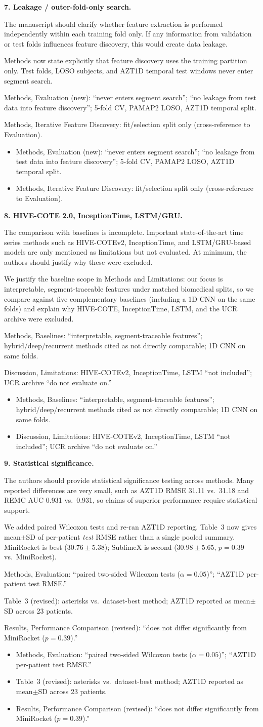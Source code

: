 \documentclass[11pt]{article}
\makeatletter
\newcommand{\rsp}{\par\vspace{0.9em}}
\newcommand{\rcitem}[2]{\begin{reviewerbox}\textbf{#1}\par\smallskip#2\end{reviewerbox}}
\newcommand{\response}[2]{%
  \begin{responsebox}#1%
  \def\@responseitems{#2}%
  \ifx\@responseitems\empty\else\begin{itemize}[nosep,leftmargin=1.2em]#2\end{itemize}\fi
  \end{responsebox}\rsp}
\makeatother
\begin{document}
\rcitem{7. Leakage / outer-fold-only search.}{The manuscript should clarify whether feature
extraction is performed independently within each training fold only. If any information from
validation or test folds influences feature discovery, this would create data leakage.}

\response{Methods now state explicitly that feature discovery uses the training partition only.
Test folds, LOSO subjects, and AZT1D temporal test windows never enter segment search.}{
  \item Methods, Evaluation (new): ``never enters segment search''; ``no leakage from test data into
    feature discovery''; 5-fold CV, PAMAP2 LOSO, AZT1D temporal split.
  \item Methods, Iterative Feature Discovery: fit/selection split only (cross-reference to Evaluation).
}

\rcitem{8. HIVE-COTE 2.0, InceptionTime, LSTM/GRU.}{The comparison with baselines is incomplete.
Important state-of-the-art time series methods such as HIVE-COTEv2, InceptionTime, and
LSTM/GRU-based models are only mentioned as limitations but not evaluated. At minimum, the authors
should justify why these were excluded.}

\response{We justify the baseline scope in Methods and Limitations: our focus is interpretable,
segment-traceable features under matched biomedical splits, so we compare against five complementary
baselines (including a 1D CNN on the same folds) and explain why HIVE-COTE, InceptionTime, LSTM, and
the UCR archive were excluded.}{
  \item Methods, Baselines: ``interpretable, segment-traceable features''; hybrid/deep/recurrent
    methods cited as not directly comparable; 1D CNN on same folds.
  \item Discussion, Limitations: HIVE-COTEv2, InceptionTime, LSTM ``not included''; UCR archive
    ``do not evaluate on.''
}

\rcitem{9. Statistical significance.}{The authors should provide statistical significance testing
across methods. Many reported differences are very small, such as AZT1D RMSE 31.11 vs.\ 31.18 and
REMC AUC 0.931 vs.\ 0.931, so claims of superior performance require statistical support.}

\response{We added paired Wilcoxon tests and re-ran AZT1D reporting. Table~3 now gives
mean$\pm$SD of per-patient \emph{test} RMSE rather than a single pooled summary.
MiniRocket is best ($30.76 \pm 5.38$); SublimeX is second ($30.98 \pm 5.65$, $p{=}0.39$ vs.\
MiniRocket).}{
  \item Methods, Evaluation: ``paired two-sided Wilcoxon tests ($\alpha{=}0.05$)''; ``AZT1D
    per-patient test RMSE.''
  \item Table~3 (revised): asterisks vs.\ dataset-best method; AZT1D reported as mean$\pm$SD across
    23 patients.
  \item Results, Performance Comparison (revised): ``does not differ significantly from MiniRocket
    ($p{=}0.39$).''
}
\end{document}
